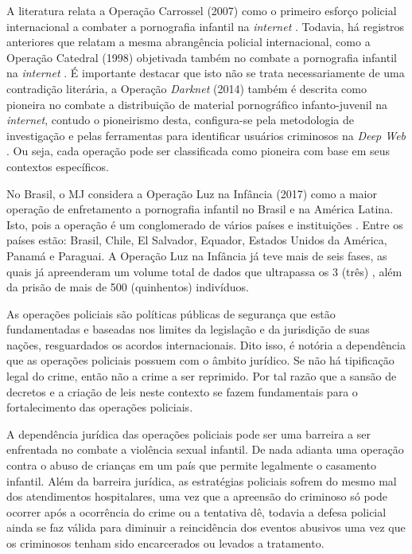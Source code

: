 A literatura relata a Operação Carrossel (2007) como o primeiro esforço policial internacional a combater a pornografia infantil na \textit{internet} \cite{lowenkron2014all}. Todavia, há registros anteriores que relatam a mesma abrangência policial internacional, como a Operação Catedral (1998) objetivada também no combate a pornografia infantil na \textit{internet} \cite{barrot2008brochuras, jesus2006anti}. É importante destacar que isto não se trata necessariamente de uma contradição literária, a Operação \textit{Darknet} (2014) também é descrita como pioneira no combate a distribuição de material pornográfico infanto-juvenil na \textit{internet}, contudo o pioneirismo desta, configura-se pela metodologia de investigação e pelas ferramentas para identificar usuários criminosos na \textit{Deep Web} \cite{tonello2018pedofilia}. Ou seja, cada operação pode ser classificada como pioneira com base em seus contextos específicos. 

No Brasil, o \ac{MJ} considera a Operação Luz na Infância (2017) como a maior operação de enfretamento a pornografia infantil no Brasil e na América Latina. Isto, pois a operação é um conglomerado de vários países e instituições \cite{souza2018sabemos}. Entre os países estão: Brasil, Chile, El Salvador, Equador, Estados Unidos da América, Panamá e Paraguai. A Operação Luz na Infância já teve mais de seis fases, as quais já apreenderam um volume total de dados que ultrapassa os 3 (três) , além da prisão de mais de 500 (quinhentos) indivíduos. 

As operações policiais são políticas públicas de segurança que estão fundamentadas e baseadas nos limites da legislação e da jurisdição de suas nações, resguardados os acordos internacionais. Dito isso, é notória a dependência que as operações policiais possuem com o âmbito jurídico. Se não há tipificação legal do crime, então não a crime a ser reprimido. Por tal razão que a sansão de decretos e a criação de leis neste contexto se fazem fundamentais para o fortalecimento das operações policiais. 

A dependência jurídica das operações policiais pode ser uma barreira a ser enfrentada no combate a violência sexual infantil. De nada adianta uma operação contra o abuso de crianças em um país que permite legalmente o casamento infantil. Além da barreira jurídica, as estratégias policiais sofrem do mesmo mal dos atendimentos hospitalares, uma vez que a apreensão do criminoso só pode ocorrer após a ocorrência do crime ou a tentativa dê, todavia a defesa policial ainda se faz válida para diminuir a reincidência dos eventos abusivos uma vez que os criminosos tenham sido encarcerados ou levados a tratamento. 


